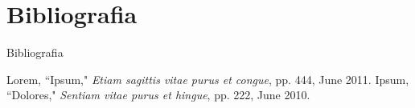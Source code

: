 \documentclass{beamer}
\begin{document}
\section{Bibliografia}
\begin{frame}{Bibliografia}
\begin{thebibliography}{10}
	Lorem, ``Ipsum," \emph{Etiam sagittis vitae purus et congue}, pp. 444, June 2011.
	Ipsum, ``Dolores," \emph{Sentiam vitae purus et hingue}, pp. 222, June 2010.
\end{thebibliography}
\end{frame}
\end{document}
